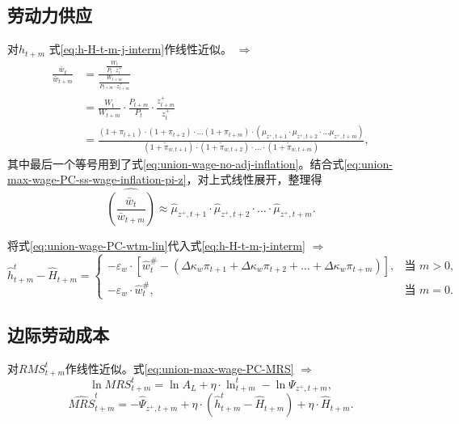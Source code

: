 \subsection{劳动力供应}
\label{sec:union-wage-PC-hours-worked}
对$h_{t+m}$ 式\eqref{eq:h-H-t-m-j-interm}作线性近似。 $\Rightarrow$
\begin{align}
\frac{\bar{w}_t}{\bar{w}_{t+m}} &=
\frac{\frac{W_t}{P_t \cdot z_t^+}}{\frac{W_{t+m}}{P_{t+m} \cdot z_{t+m}^{+}}} \nonumber \\
&= \frac{W_t}{W_{t+m}} \cdot \frac{P_{t+m}}{P_{t}} \cdot \frac{z^+_{t+m}}{z^+_t} \nonumber \\
&= \frac{\left(1+\pi_{t+1}\right) \cdot \left(1+\pi_{t+2}\right) \cdot \ldots \left(1+\pi_{t+m}\right) \cdot \left(\mu_{z^+,t+1} \cdot \mu_{z^+,t+2} \cdot \ldots \mu_{z^+,t+m}\right)}{\left(1+\tilde{\pi}_{w,t+1}\right) \cdot \left(1+\tilde{\pi}_{w,t+2}\right) \cdot \ldots \cdot \left(1+\tilde{\pi}_{w,t+m}\right)},
\end{align}
其中最后一个等号用到了式\eqref{eq:union-wage-no-adj-inflation}。结合式\eqref{eq:union-max-wage-PC-ss-wage-inflation-pi-z}，对上式线性展开，整理得
\begin{equation}
\label{eq:union-wage-PC-wtm-lin}
\hat{\left(\frac{\bar{w}_t}{\bar{w}_{t+m}}\right)} \approx \hat{\mu}_{z^+,t+1} \cdot \hat{\mu}_{z^+,t+2} \cdot \ldots \cdot \hat{\mu}_{z^+,t+m}.
\end{equation}

将式\eqref{eq:union-wage-PC-wtm-lin}代入式\eqref{eq:h-H-t-m-j-interm} $\Rightarrow$
\begin{equation}
\label{eq:union-wage-PC-htm-lin}
\hat{h}^t_{t+m} - \hat{H}_{t+m} =
\begin{cases}
-\varepsilon_w \cdot \left[\hat{w}^{\#}_t - \left( \Delta \kappa_w \pi_{t+1} + \Delta \kappa_w \pi_{t+2} + \ldots + \Delta \kappa_w \pi_{t+m}\right)\right], & \text{当 }m>0, \\
-\varepsilon_w \cdot \hat{w}^{\#}_t, & \text{当 }m=0.
\end{cases}
\end{equation}



\subsection{边际劳动成本}
\label{sec:union-wage-PC-wage-MRS}
对$RMS^t_{t+m}$作线性近似。式\eqref{eq:union-max-wage-PC-MRS} $\Rightarrow$
\begin{equation*}
\ln MRS^t_{t+m} = \ln A_L + \eta \cdot \ln^t_{t+m} - \ln \Psi_{z^+,t+m},
\end{equation*}
\begin{equation}
\label{eq:union-wage-MRS-lin}
\hat{MRS}^t_{t+m} = -\hat{\Psi}_{z^+,t+m}+ \eta \cdot\left(\hat{h}^t_{t+m} - \hat{H}_{t+m}\right)+ \eta \cdot \hat{H}_{t+m}.
\end{equation}

